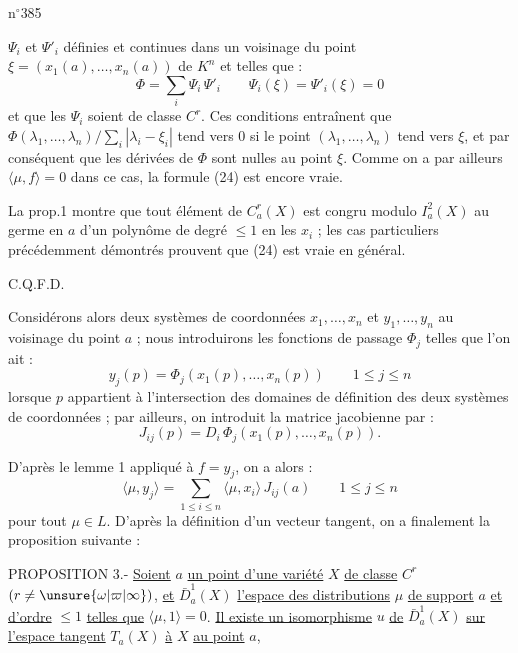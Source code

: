 
n$^{\circ}$385

$\Psi_i$ et $\Psi'_i$ définies et continues dans un voisinage du point $\xi=(x_1(a),\ldots,x_n(a))$ de $K^n$ et telles que :
\[
\Phi=\sum_i\Psi_i\,\Psi'_i\qquad\Psi_i(\xi)=\Psi'_i(\xi)=0
\]
et que les $\Psi_i$ soient de classe $C^r$. Ces conditions entraînent que $\Phi(\lambda_1,\ldots,\lambda_n)/\sum\limits_i|\lambda_i-\xi_i|$ tend vers $0$ si le point $(\lambda_1,\ldots,\lambda_n)$ tend vers $\xi$, et par conséquent que les dérivées de $\Phi$ sont nulles au point $\xi$. Comme on a par ailleurs $\langle\mu,f\rangle=0$ dans ce cas, la formule (24) est encore vraie.

La prop.1 montre que tout élément de $C_a^r(X)$ est congru modulo $I_a^2(X)$ au germe en $a$ d'un polynôme de degré $\leq 1$ en les $x_i$ ; les cas particuliers précédemment démontrés prouvent que (24) est vraie en général.

\hfill C.Q.F.D.

Considérons alors deux systèmes de coordonnées $x_1,\ldots,x_n$ et $y_1,\ldots,y_n$ au voisinage du point $a$ ; nous introduirons les fonctions de passage $\Phi_j$ telles que l'on ait :
\[
y_j(p)=\Phi_j(x_1(p),\ldots,x_n(p))\qquad 1\leq j\leq n\tag*{(26)}
\]
lorsque $p$ appartient à l'intersection des domaines de définition des deux systèmes de coordonnées ; par ailleurs, on introduit la matrice jacobienne par :
\[
J_{ij}(p)=D_i\,\Phi_j(x_1(p),\ldots,x_n(p)).
\]

D'après le lemme 1 appliqué à $f=y_j$, on a alors :
\[
\langle\mu,y_j\rangle=\sum_{1\leq i\leq n}\langle\mu,x_i\rangle\,J_{ij}(a)\qquad 1\leq j\leq n\tag*{(27)}
\]
pour tout $\mu\in L$. D'après la définition d'un vecteur tangent, on a finalement la proposition suivante :

PROPOSITION 3.- \uline{Soient} $a$ \uline{un point d'une variété} $X$ \uline{de classe} $C^r$ $(r\ne\unsure{\omega|\varpi|\infty})$, \uline{et} $\bar D_a^1(X)$ \uline{l'espace des distributions} $\mu$ \uline{de support} $a$ \uline{et d'ordre} $\leq 1$ \uline{telles que} $\langle\mu,1\rangle=0$. \uline{Il existe un isomorphisme} $u$ \uline{de} $\bar D_a^1(X)$ \uline{sur l'espace tangent} $T_a(X)$ \uline{à} $X$ \uline{au point} $a$,

